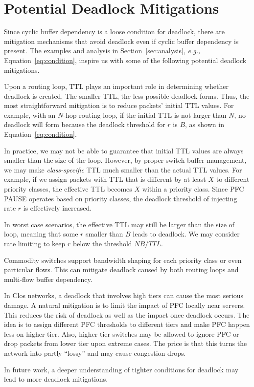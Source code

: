 \section{Potential Deadlock Mitigations}
\label{sec:mitigation}

Since cyclic buffer dependency is a loose condition for deadlock, there are 
mitigation mechanisms that avoid deadlock even if cyclic buffer dependency is present. 
The examples and analysis in Section~\ref{sec:analysis}, {\em e.g.,} Equation~\ref{eq:condition},
inspire us with some of the following potential deadlock mitigations. 


 Upon a routing loop, TTL plays an important role in 
determining whether deadlock is created. The smaller TTL, the less possible deadlock forms.
Thus, the most straightforward mitigation is to reduce packets' initial TTL values.
For example, with an $N$-hop routing loop, if the initial TTL is not larger than $N$,
no deadlock will form because the deadlock threshold for $r$ is $B$, as shown in 
Equation~\ref{eq:condition}.

In practice, we may not be able to guarantee that initial TTL values are always smaller than
the size of the loop. However, by proper switch buffer management, we may make {\em class-specific}
TTL much smaller than the actual TTL values. For example, if we assign packets with TTL that 
is different by at least $X$ to different priority classes, the effective TTL becomes $X$
within a priority class. Since PFC PAUSE operates based on priority classes, the deadlock threshold
of injecting rate $r$ is effectively increased.

In worst case scenarios, the effective TTL may still be larger than the size of loop, meaning
that some $r$ smaller than $B$ leads to deadlock. We may consider rate limiting to keep 
$r$ below the threshold $NB/TTL$.

 Commodity switches support bandwidth shaping for each priority class
or even particular flows. This can mitigate deadlock caused by both routing loops and multi-flow
buffer dependency. 


In Clos networks, a deadlock that involves high tiers can cause the most serious damage.
A natural mitigation is to limit the impact of PFC locally near servers. This reduces
the risk of deadlock as well as the impact once deadlock occurs.
The idea is to assign different PFC thresholds to different tiers and make PFC happen less
on higher tier. Also, higher tier switches may be allowed to ignore PFC or drop packets from
lower tier upon extreme cases.
The price is that this turns the network into partly
``lossy'' and may cause congestion drops.



In future work, a deeper understanding of tighter conditions for deadlock may
lead to more deadlock mitigations.